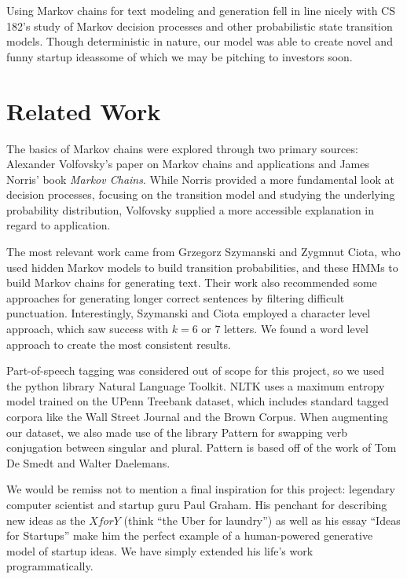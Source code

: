 \documentclass[11pt]{article}
\begin{document}
Using Markov chains for text modeling and generation fell in line nicely with CS 182's study of Markov decision processes and other probabilistic state transition models. Though deterministic in nature, our model was able to create novel and funny startup ideas\textemdash some of which we may be pitching to investors soon.

\section{Related Work}

The basics of Markov chains were explored through two primary sources: Alexander Volfovsky's paper on Markov chains and applications\cite{volfovsky2007} and James Norris' book \textit{Markov Chains}.\cite{norris1998} While Norris provided a more fundamental look at decision processes, focusing on the transition model and studying the underlying probability distribution, Volfovsky supplied a more accessible explanation in regard to application.

The most relevant work came from Grzegorz Szymanski and Zygmnut Ciota, who used hidden Markov models to build transition probabilities, and these HMMs to build Markov chains for generating text.\cite{szymanski2014} Their work also recommended some approaches for generating longer correct sentences by filtering difficult punctuation. Interestingly, Szymanski and Ciota employed a character level approach, which saw success with \(k = 6\) or \(7\) letters. We found a word level approach to create the most consistent results.

Part-of-speech tagging was considered out of scope for this project, so we used the python library Natural Language Toolkit.\cite{bird2015} NLTK uses a maximum entropy model trained on the UPenn Treebank dataset, which includes standard tagged corpora like the Wall Street Journal and the Brown Corpus.\cite{ratnaparkhi1996} When augmenting our dataset, we also made use of the library Pattern for swapping verb conjugation between singular and plural. Pattern is based off of the work of Tom De Smedt and Walter Daelemans.
\cite{desmedt2015}

We would be remiss not to mention a final inspiration for this project: legendary computer scientist and startup guru Paul Graham. His penchant for describing new ideas as the \(X for Y\) (think ``the Uber for laundry'') as well as his essay ``Ideas for Startups'' make him the perfect example of a human-powered generative model of startup ideas.\cite{graham2005} We have simply extended his life's work programmatically.
\end{document}
